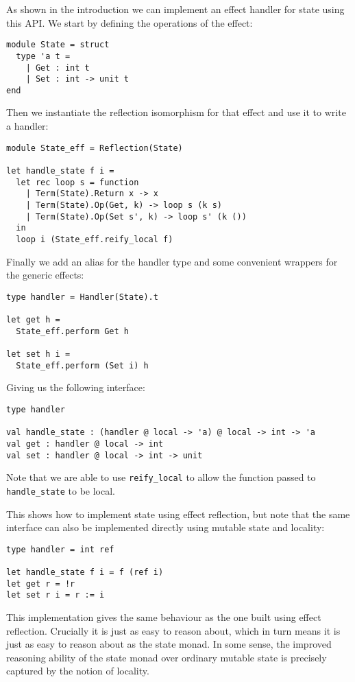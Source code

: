 \documentclass[acmsmall, screen, nonacm]{acmart}
\theoremstyle{definition}
\begin{document}
As shown in the introduction we can implement an effect handler for
state using this API. We start by defining the operations of the effect:
\begin{lstlisting}[style=oxcaml]
module State = struct
  type 'a t =
    | Get : int t
    | Set : int -> unit t
end
\end{lstlisting}
Then we instantiate the reflection isomorphism for that effect and use
it to write a handler:
\begin{lstlisting}[style=oxcaml]
module State_eff = Reflection(State)

let handle_state f i =
  let rec loop s = function
    | Term(State).Return x -> x
    | Term(State).Op(Get, k) -> loop s (k s)
    | Term(State).Op(Set s', k) -> loop s' (k ())
  in
  loop i (State_eff.reify_local f)
\end{lstlisting}
Finally we add an alias for the handler type and some convenient
wrappers for the generic effects:
\begin{lstlisting}[style=oxcaml]
type handler = Handler(State).t

let get h =
  State_eff.perform Get h

let set h i =
  State_eff.perform (Set i) h
\end{lstlisting}
Giving us the following interface:
\begin{lstlisting}[style=oxcaml]
type handler

val handle_state : (handler @ local -> 'a) @ local -> int -> 'a
val get : handler @ local -> int
val set : handler @ local -> int -> unit
\end{lstlisting}
Note that we are able to use \lstinline[style=oxcaml]{reify_local} to allow
the function passed to \lstinline[style=oxcaml]{handle_state} to be local.

This shows how to implement state using effect reflection, but note that
the same interface can also be implemented directly using mutable state
and locality:
\begin{lstlisting}[style=oxcaml]
type handler = int ref

let handle_state f i = f (ref i)
let get r = !r
let set r i = r := i
\end{lstlisting}
This implementation gives the same behaviour as the one built using
effect reflection. Crucially it is just as easy to reason about, which
in turn means it is just as easy to reason about as the state monad. In
some sense, the improved reasoning ability of the state monad over
ordinary mutable state is precisely captured by the notion of locality.
\end{document}
